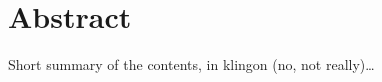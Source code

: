 \thispagestyle{empty}
\chapter*{Abstract}
Short summary of the contents, in klingon (no, not really)\ldots

